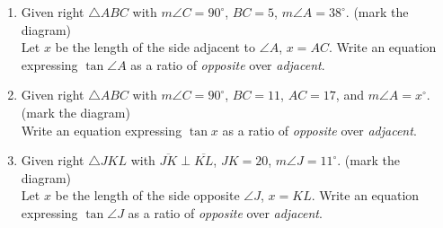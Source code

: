 \begin{enumerate}
\newpage
  \item Given right $\triangle ABC$ with $m\angle C =90^\circ$, $BC=5$, $m\angle A=38^\circ$. (mark the diagram)\\[0.5cm]
  Let $x$ be the length of the side adjacent to $\angle A$, $x=AC$. Write an equation expressing $\tan \angle A$ as a ratio of \emph{opposite} over \emph{adjacent}.
    \begin{flushright}
      \end{flushright}

  \item Given right $\triangle ABC$ with $m\angle C =90^\circ$, $BC=11$, $AC=17$, and $m\angle A=x^\circ$. (mark the diagram)\\[0.5cm]
  Write an equation expressing $\tan x$ as a ratio of \emph{opposite} over \emph{adjacent}.
    \begin{flushright}
      \end{flushright}
  
  \item Given right $\triangle JKL$ with $\overline{JK} \perp \overline{KL}$, $JK=20$, $m\angle J=11^\circ$. (mark the diagram)\\[0.5cm]
    Let $x$ be the length of the side opposite $\angle J$, $x=KL$. Write an equation expressing $\tan \angle J$ as a ratio of \emph{opposite} over \emph{adjacent}.
      \begin{flushright}
        \end{flushright}
\newpage

\end{enumerate}
